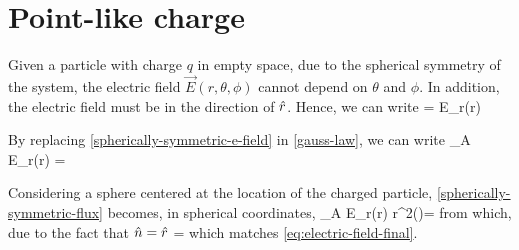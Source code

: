 \section{Point-like charge}
Given a particle with charge $q$ in empty space, due to the spherical symmetry of the system, the electric field $\vec{E}(r,\theta,\phi)$ 
cannot depend on $\theta$ and $\phi$. In addition, the electric field must be in the direction of $\hat{r}$. Hence, we can write
\be\label{spherically-symmetric-e-field}
 = E_r(r) 
\ee

By replacing \ref{spherically-symmetric-e-field} in \ref{gauss-law}, we can write
\be\label{spherically-symmetric-flux}
\oiint_A E_r(r)  \cdot {} =
\ee

Considering a sphere centered at the location of the charged particle, \ref{spherically-symmetric-flux} becomes, in spherical coordinates,
\be\label{spherically-symmetric-flux-2}
\oiint_A E_r(r)  \cdot {}r^{2}\sin(\phi)\theta{}\phi =
\ee
from which, due to the fact that $\hat{n}=\hat{r}$
\be
{}=
\ee
which matches \ref{eq:electric-field-final}.
